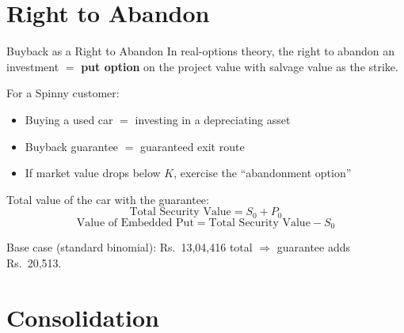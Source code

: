 \documentclass[11pt, aspectratio=43]{beamer}
\begin{document}
\section{Right to Abandon}

\begin{frame}{Buyback as a Right to Abandon}
    In real-options theory, the right to abandon an investment $=$ \textbf{put option} on the project value with salvage value as the strike.

    \vspace{0.8em}
    For a Spinny customer:
    \begin{itemize}
        \item Buying a used car $=$ investing in a depreciating asset
        \item Buyback guarantee $=$ guaranteed exit route
        \item If market value drops below $K$, exercise the ``abandonment option''
    \end{itemize}

    \vspace{0.8em}
    Total value of the car with the guarantee:
    \[
        \text{Total Security Value} = S_0 + P_0
    \]
    \[
        \text{Value of Embedded Put} = \text{Total Security Value} - S_0
    \]

    Base case (standard binomial): Rs.~13,04,416 total $\Rightarrow$ guarantee adds Rs.~20,513.
\end{frame}


\section{Consolidation}
\end{document}
